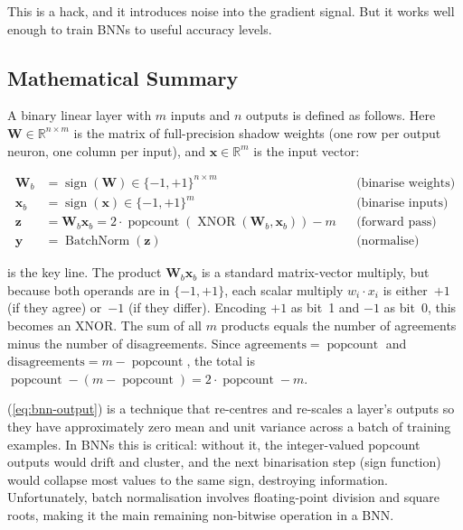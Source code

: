 This is a hack, and it introduces noise into the gradient signal. But
it works well enough to train BNNs to useful accuracy levels.

\subsection{Mathematical Summary}
\label{sec:bnn-math}

A binary linear layer with $m$ inputs and $n$ outputs is defined as
follows. Here $\bm{W} \in \mathbb{R}^{n \times m}$ is the matrix of
full-precision shadow weights (one row per output neuron, one column
per input), and $\bm{x} \in \mathbb{R}^m$ is the input vector:

\begin{align}
  \bm{W}_b &= \operatorname{sign}(\bm{W}) \in \{-1, +1\}^{n \times m}
    & &\text{(binarise weights)}
    \label{eq:bnn-weight} \\
  \bm{x}_b &= \operatorname{sign}(\bm{x}) \in \{-1, +1\}^m
    & &\text{(binarise inputs)}
    \label{eq:bnn-input} \\
  \bm{z} &= \bm{W}_b \bm{x}_b
    = 2 \cdot \operatorname{popcount}(\operatorname{XNOR}(\bm{W}_b, \bm{x}_b)) - m
    & &\text{(forward pass)}
    \label{eq:bnn-forward} \\
  \bm{y} &= \operatorname{BatchNorm}(\bm{z})
    & &\text{(normalise)}
    \label{eq:bnn-output}
\end{align}

 is the key line. The product $\bm{W}_b \bm{x}_b$
is a standard matrix-vector multiply, but because both operands are in
$\{-1,+1\}$, each scalar multiply $w_i \cdot x_i$ is either~$+1$ (if
they agree) or~$-1$ (if they differ). Encoding $+1$ as bit~1 and $-1$
as bit~0, this becomes an XNOR. The sum of all $m$ products equals
the number of agreements minus the number of disagreements. Since
$\text{agreements} = \operatorname{popcount}$ and
$\text{disagreements} = m - \operatorname{popcount}$, the total is
$\operatorname{popcount} - (m - \operatorname{popcount})
= 2 \cdot \operatorname{popcount} - m$.

 (\cref{eq:bnn-output}) is a technique
that re-centres and re-scales a layer's outputs so they have
approximately zero mean and unit variance across a batch of training
examples. In BNNs this is critical: without it, the integer-valued
popcount outputs would drift and cluster, and the next binarisation
step (sign function) would collapse most values to the same sign,
destroying information. Unfortunately, batch normalisation involves
floating-point division and square roots, making it the main
remaining non-bitwise operation in a BNN.

